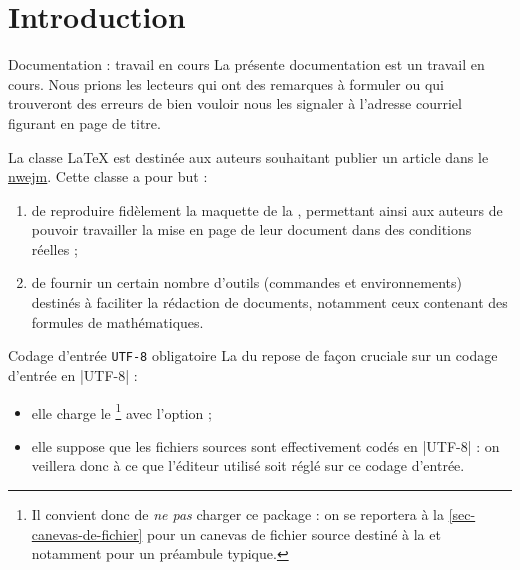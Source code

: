 \section*{Introduction}
\label{sec-introduction}

\begin{dbremark}{Documentation : travail en cours}{}
  La présente documentation est un travail en cours. Nous prions les lecteurs
  qui ont des remarques à formuler ou qui trouveront des erreurs de bien vouloir
  nous les signaler à l'adresse courriel figurant en page de titre.
\end{dbremark}

La classe \LaTeX{} \nwejmauthor{} est destinée aux auteurs souhaitant publier un
article dans le \href{http://math.univ-lille1.fr/~nwejm/}{\gls{nwejm}}. Cette
classe a pour but :
\begin{enumerate}
\item de reproduire fidèlement la maquette de la \nwejm{}, permettant ainsi
  aux auteurs de pouvoir travailler la mise en page de leur document dans des
  conditions réelles ;
\item de fournir un certain nombre d'outils (commandes et environnements)
  destinés à faciliter la rédaction de documents, notamment ceux contenant des
  formules de mathématiques.
\end{enumerate}

\begin{dbwarning}{Codage d'entrée \protect\lstinline+UTF-8+ obligatoire}{}
  La \nwejmauthorcl{} du \nwejm{} repose de façon cruciale sur un codage
  d'entrée en |UTF-8| :
  \begin{itemize}
  \item elle charge le \footnote{%
      Il convient donc de \emph{ne pas} charger ce package : on se reportera
      à la \vref{sec-canevas-de-fichier} pour un canevas de fichier source
      destiné à la \nwejm{} et notamment pour un préambule typique.%
    }
    avec l'option  ;
  \item elle suppose que les fichiers sources  sont effectivement
    codés en |UTF-8| : on veillera donc à ce que l'éditeur utilisé soit réglé
    sur ce codage d'entrée.
  \end{itemize}
\end{dbwarning}

